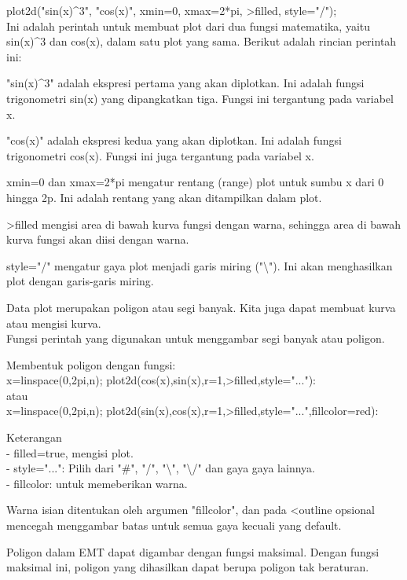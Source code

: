 \documentclass[a4paper,10pt]{article}
\begin{document}
\begin{eulernotebook}
\begin{eulercomment}
\begin{eulercomment}
\begin{eulercomment}
\begin{eulercomment}
\begin{eulercomment}
\begin{eulercomment}
\begin{eulercomment}
\begin{eulercomment}
\begin{eulercomment}
plot2d("sin(x)\textasciicircum{}3", "cos(x)", xmin=0, xmax=2*pi, \textgreater{}filled, style="/");\\
Ini adalah perintah untuk membuat plot dari dua fungsi matematika,
yaitu sin(x)\textasciicircum{}3 dan cos(x), dalam satu plot yang sama. Berikut adalah
rincian perintah ini:

"sin(x)\textasciicircum{}3" adalah ekspresi pertama yang akan diplotkan. Ini adalah
fungsi trigonometri sin(x) yang dipangkatkan tiga. Fungsi ini
tergantung pada variabel x.

"cos(x)" adalah ekspresi kedua yang akan diplotkan. Ini adalah fungsi
trigonometri cos(x). Fungsi ini juga tergantung pada variabel x.

xmin=0 dan xmax=2*pi mengatur rentang (range) plot untuk sumbu x dari
0 hingga 2p. Ini adalah rentang yang akan ditampilkan dalam plot.

\textgreater{}filled mengisi area di bawah kurva fungsi dengan warna, sehingga area
di bawah kurva fungsi akan diisi dengan warna.

style="/" mengatur gaya plot menjadi garis miring ("\textbackslash{}"). Ini akan
menghasilkan plot dengan garis-garis miring.
\end{eulercomment}
\begin{eulercomment}
Data plot merupakan poligon atau segi banyak. Kita juga dapat membuat
kurva atau mengisi kurva.\\
Fungsi perintah yang digunakan untuk menggambar segi banyak atau
poligon.

Membentuk poligon dengan fungsi:\\
x=linspace(0,2pi,n); plot2d(cos(x),sin(x),r=1,\textgreater{}filled,style="..."):\\
atau\\
x=linspace(0,2pi,n);
plot2d(sin(x),cos(x),r=1,\textgreater{}filled,style="...",fillcolor=red):

Keterangan\\
- filled=true, mengisi plot.\\
- style="...": Pilih dari "#", "/", "\textbackslash{}", "\textbackslash{}/" dan gaya gaya lainnya.\\
- fillcolor: untuk memeberikan warna.

Warna isian ditentukan oleh argumen "fillcolor", dan pada \textless{}outline
opsional mencegah menggambar batas untuk semua gaya kecuali yang
default.

Poligon dalam EMT dapat digambar dengan fungsi maksimal. Dengan fungsi
maksimal ini, poligon yang dihasilkan dapat berupa poligon tak
beraturan.


\end{eulercomment}
\end{eulercomment}
\end{eulercomment}
\end{eulercomment}
\end{eulercomment}
\end{eulercomment}
\end{eulercomment}
\end{eulercomment}
\end{eulercomment}
\end{eulernotebook}
\end{document}
